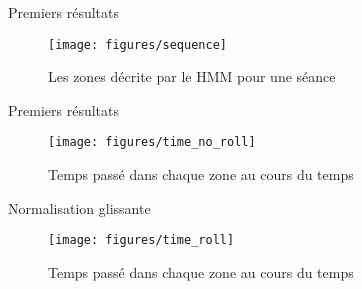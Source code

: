 \documentclass{beamer}
\begin{document}
\begin{frame}{Premiers résultats}
    \begin{figure}
        \centering
        \texttt{[image: figures/sequence]}
        \caption{Les zones décrite par le HMM pour une séance}
    \end{figure}
\end{frame}
\begin{frame}{Premiers résultats}
    \begin{figure}
        \centering
        \texttt{[image: figures/time\_no\_roll]}
        \caption{Temps passé dans chaque zone au cours du temps}
        \end{figure}
\end{frame}
\begin{frame}{Normalisation glissante}
    \begin{figure}
        \centering
        \texttt{[image: figures/time\_roll]}
        \caption{Temps passé dans chaque zone au cours du temps}
        \end{figure}
\end{frame}


\end{document}
